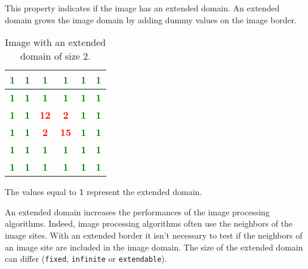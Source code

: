 This property indicates if the image has an extended domain.
An extended domain grows the image domain by adding dummy values
on the image border.
\begin{table}[!h]
  \begin{center}
    \begin{tabular}{c|c|c|c|c|c}
      {\textbf{\textcolor{green}{1}}} & {\textbf{\textcolor{green}{1}}} &
      {\textbf{\textcolor{green}{1}}} & {\textbf{\textcolor{green}{1}}} &
      {\textbf{\textcolor{green}{1}}} & {\textbf{\textcolor{green}{1}}}\\
      \hline
      {\textbf{\textcolor{green}{1}}} & {\textbf{\textcolor{green}{1}}} &
      {\textbf{\textcolor{green}{1}}} & {\textbf{\textcolor{green}{1}}} &
      {\textbf{\textcolor{green}{1}}} & {\textbf{\textcolor{green}{1}}}\\
      \hline
      {\textbf{\textcolor{green}{1}}} &
      {\textbf{\textcolor{green}{1}}} & {\textbf{\textcolor{red}{12}}} &
      {\textbf{\textcolor{red}{2}}} & {\textbf{\textcolor{green}{1}}} &
      {\textbf{\textcolor{green}{1}}}\\
      \hline
      {\textbf{\textcolor{green}{1}}} &
      {\textbf{\textcolor{green}{1}}} & {\textbf{\textcolor{red}{2}}} &
      {\textbf{\textcolor{red}{15}}} & {\textbf{\textcolor{green}{1}}} &
      {\textbf{\textcolor{green}{1}}}\\
      \hline
      {\textbf{\textcolor{green}{1}}} & {\textbf{\textcolor{green}{1}}} &
      {\textbf{\textcolor{green}{1}}} & {\textbf{\textcolor{green}{1}}} &
      {\textbf{\textcolor{green}{1}}} & {\textbf{\textcolor{green}{1}}}\\
      \hline
      {\textbf{\textcolor{green}{1}}} & {\textbf{\textcolor{green}{1}}} &
      {\textbf{\textcolor{green}{1}}} & {\textbf{\textcolor{green}{1}}} &
      {\textbf{\textcolor{green}{1}}} & {\textbf{\textcolor{green}{1}}}\\
    \end{tabular}
    The values equal to  {\textbf{\textcolor{green}{1}}} represent the extended domain.
  \end{center}
  \label{tab:pprop01}\caption{Image with an extended domain of size 2.}
\end{table}
An extended domain increases the performances of the image processing
algorithms.
Indeed, image processing algorithms often use the neighbors of the image
sites.
With an extended border it isn't necessary to test if the neighbors of an image
site are included in the image domain.
The size of the extended domain can differ (\verb+fixed+, \verb+infinite+ or
\verb+extendable+).



